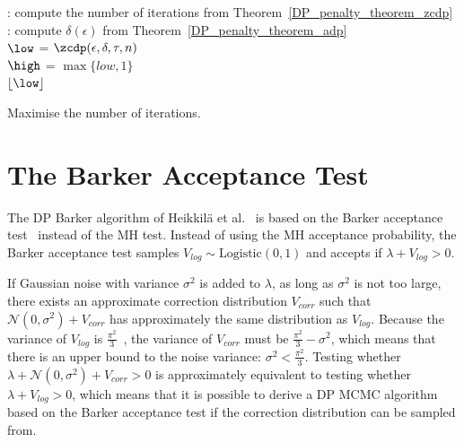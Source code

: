 \documentclass[english,twoside,openright]{HYgraduMLDS}
\newcommand{\caln}{{\mathcal{N}}}
\begin{document}
\begin{algorithm}[H]\label{max_iterations_algo}
  \zcdp : compute the number of iterations from Theorem~\ref{DP_penalty_theorem_zcdp}\\
  \adp : compute \(\delta(\epsilon)\) from Theorem~\ref{DP_penalty_theorem_adp}\\

	\(\low\) = \(\zcdp(\epsilon, \delta, \tau, n)\) \\
  \(\high\) = \(\max \{low, 1\}\) \\

  {
    \Return \(\lfloor \low \rfloor\)\\
  }

  \caption{
    Maximise the number of iterations.
  }
\end{algorithm}

\section{The Barker Acceptance Test}\label{dp_barker_section}

The DP Barker algorithm of Heikkilä et al.~\cite{HeikkilaJDH19} is based on
the Barker acceptance test~\cite{Barker65} instead of the MH test.
Instead of using the MH acceptance probability, the Barker acceptance test samples 
\(V_{log}\sim \mathrm{Logistic(0, 1)}\) and accepts if \(\lambda + V_{log} > 0\).

If Gaussian noise with variance \(\sigma^2\) is added to 
\(\lambda\), as long as \(\sigma^{2}\) is not too large, there exists an
approximate correction
distribution \(V_{corr}\) such that \(\caln(0, \sigma^2) + V_{corr}\) has
approximately the same distribution as \(V_{log}\). Because the variance of
\(V_{log}\) is
\(\frac{\pi^2}{3}\)~\cite{HeikkilaJDH19}, the variance of \(V_{corr}\) must be 
\(\frac{\pi^2}{3} - \sigma^2\), which means that there is an upper bound
to the noise variance: \(\sigma^2 < \frac{\pi^2}{3}\). Testing whether 
\(\lambda + \caln(0, \sigma^2) + V_{corr} > 0\) is approximately equivalent
to testing 
whether \(\lambda + V_{log} > 0\), which means that it is possible to derive 
a DP MCMC algorithm based on the Barker acceptance test if the correction 
distribution can be sampled from.
\end{document}
